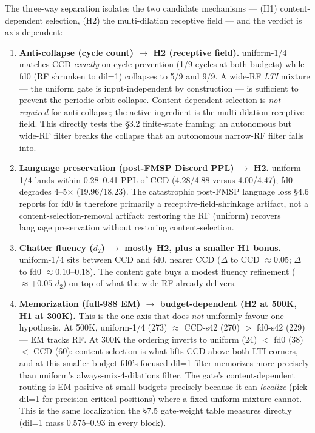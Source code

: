 \documentclass[11pt]{article}
\begin{document}
The three-way separation isolates the two candidate mechanisms --- (H1) content-dependent selection, (H2) the multi-dilation receptive field --- and the verdict is axis-dependent:

\begin{enumerate}
\item \textbf{Anti-collapse (cycle count) $\to$ H2 (receptive field).} uniform-1/4 matches CCD \emph{exactly} on cycle prevention (1/9 cycles at both budgets) while fd0 (RF shrunken to dil=1) collapses to 5/9 and 9/9. A wide-RF \emph{LTI} mixture --- the uniform gate is input-independent by construction --- is sufficient to prevent the periodic-orbit collapse. Content-dependent selection is \emph{not required} for anti-collapse; the active ingredient is the multi-dilation receptive field. This directly tests the \S3.2 finite-state framing: an autonomous but wide-RF filter breaks the collapse that an autonomous narrow-RF filter falls into.

\item \textbf{Language preservation (post-FMSP Discord PPL) $\to$ H2.} uniform-1/4 lands within 0.28--0.41 PPL of CCD (4.28/4.88 versus 4.00/4.47); fd0 degrades 4--5$\times$ (19.96/18.23). The catastrophic post-FMSP language loss \S4.6 reports for fd0 is therefore primarily a receptive-field-shrinkage artifact, not a content-selection-removal artifact: restoring the RF (uniform) recovers language preservation without restoring content-selection.

\item \textbf{Chatter fluency ($d_2$) $\to$ mostly H2, plus a smaller H1 bonus.} uniform-1/4 sits between CCD and fd0, nearer CCD ($\Delta$ to CCD $\approx 0.05$; $\Delta$ to fd0 $\approx 0.10$--$0.18$). The content gate buys a modest fluency refinement ($\approx +0.05$ $d_2$) on top of what the wide RF already delivers.

\item \textbf{Memorization (full-988 EM) $\to$ budget-dependent (H2 at 500K, H1 at 300K).} This is the one axis that does \emph{not} uniformly favour one hypothesis. At 500K, uniform-1/4 (273) $\approx$ CCD-s42 (270) $>$ fd0-s42 (229) --- EM tracks RF. At 300K the ordering inverts to uniform (24) $<$ fd0 (38) $<$ CCD (60): content-selection is what lifts CCD above both LTI corners, and at this smaller budget fd0's focused dil=1 filter memorizes more precisely than uniform's always-mix-4-dilations filter. The gate's content-dependent routing is EM-positive at small budgets precisely because it can \emph{localize} (pick dil=1 for precision-critical positions) where a fixed uniform mixture cannot. This is the same localization the \S7.5 gate-weight table measures directly (dil=1 mass 0.575--0.93 in every block).
\end{enumerate}
\end{document}
